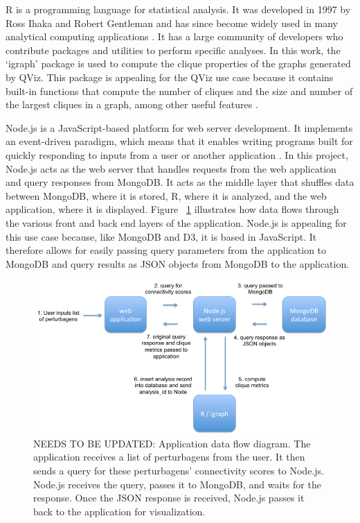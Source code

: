 \documentclass[12pt]{article}
\begin{document}
R is a programming language for statistical analysis. It was developed in 1997 by Ross Ihaka and Robert Gentleman and has since become widely used in many analytical computing applications \cite{r_lang}. It has a large community of developers who contribute packages and utilities to perform specific analyses. In this work, the `igraph' package is used to compute the clique properties of the graphs generated by QViz. This package is appealing for the QViz use case because it contains built-in functions that compute the number of cliques and the size and number of the largest cliques in a graph, among other useful features \cite{igraph}.

Node.js is a JavaScript-based platform for web server development. It implements an event-driven paradigm, which means that it enables writing programs built for quickly responding to inputs from a user or another application \cite{node}. In this project, Node.js acts as the web server that handles requests from the web application and query responses from MongoDB. It acts as the middle layer that shuffles data between MongoDB, where it is stored, R, where it is analyzed, and the web application, where it is displayed. Figure ~\ref{fig:app_data_flow} illustrates how data flows through the various front and back end layers of the application. Node.js is appealing for this use case because, like MongoDB and D3, it is based in JavaScript. It therefore allows for easily passing query parameters from the application to MongoDB and query results as JSON objects from MongoDB to the application.


\begin{figure}[h]
\centering
\includegraphics[scale=0.5]{img/app_data_flow_small.png}
\caption{ NEEDS TO BE UPDATED: Application data flow diagram. The application receives a list of perturbagens from the user. It then sends a query for these perturbagens' connectivity scores to Node.js. Node.js receives the query, passes it to MongoDB, and waits for the response. Once the JSON response is received, Node.js passes it back to the application for visualization.}
\label{fig:app_data_flow}
\end{figure}
\end{document}
